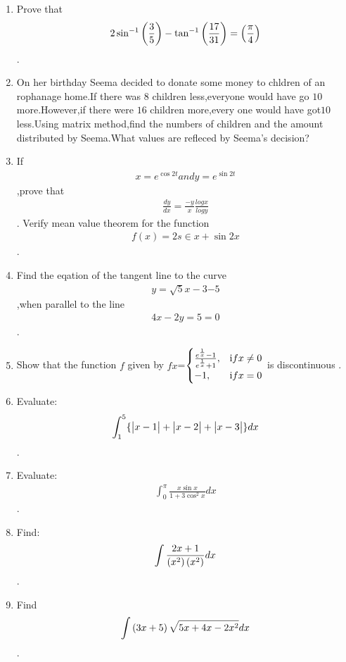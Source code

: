 \documentclass[12pt,-letter paper]{article}
\begin{document}
\begin{enumerate}
	\item Prove that \begin{align}2\sin^{-1}\left(\frac{3}{5}\right)-\tan^{-1}\left(\frac{17}{31}\right)=\left(\frac{\pi}{4}\right)\end{align}.
\item On her birthday Seema decided to donate some money to chldren of an rophanage home.If there was $8$ children less,everyone would have go \rupee $10$ more.However,if there were $16$ children more,every one would have got\rupee $10$ less.Using matrix method,find the numbers of children and the amount distributed by Seema.What values are refleced by Seema's decision?
\item If \begin{align}x=e^{\cos2t} and y=e^{\sin2t}\end{align},prove that \begin{align}\frac{dy}{dx}=\frac{-y}{x} \frac{logx}{logy}\end{align}. Verify mean value theorem for the function \begin{align}f(x)=2s\in x+\sin2x \end{align}.
	\item Find the eqation of the tangent line to the curve \begin{align}y={\sqrt5x-3}{-5}\end{align},when parallel to the line \begin{align}4x-2y=5=0\end{align} .
		\item Show that the function $f$ given by $fx$=$\begin{cases}\frac{e^{\frac{1}{x}}-1}{e^{\frac{1}{x}}+1},& \text if x\neq0\\ -1,& \text if x=0 \end{cases}$ is discontinuous . 
				\item Evaluate: \begin{align}\int_{1}^{5} \{\begin{vmatrix}x-1\end{vmatrix} + \begin{vmatrix}x-2\end{vmatrix} + \begin{vmatrix}x-3\end{vmatrix}\}dx\end{align}.
					\item Evaluate: \begin{align}\int_{0}^{\pi} \frac{x\sin x}{1+3\cos^2x}dx\end{align}.
						\item Find: \begin{align}\int\frac{2x+1}{\left(x^2\right)\left(x^2\right)}dx\end{align}.
							\item Find \begin{align}\int \left(3x+5\right) \sqrt{5x+4x-2x^2}dx\end{align} .

\end{enumerate}
\end{document}
